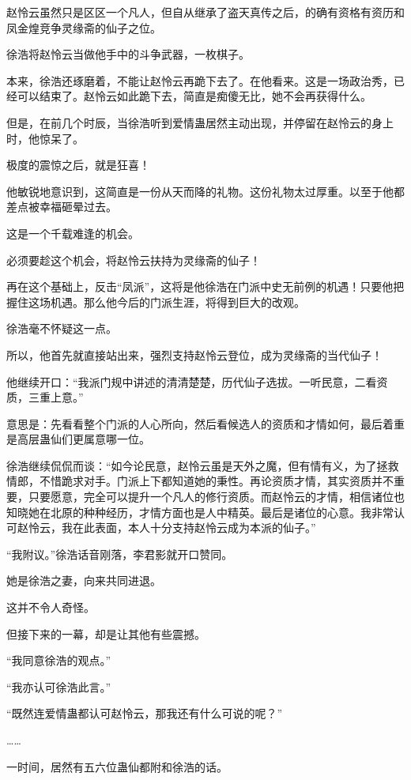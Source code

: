 \begin{this_body}
赵怜云虽然只是区区一个凡人，但自从继承了盗天真传之后，的确有资格有资历和凤金煌竞争灵缘斋的仙子之位。

徐浩将赵怜云当做他手中的斗争武器，一枚棋子。

本来，徐浩还琢磨着，不能让赵怜云再跪下去了。在他看来。这是一场政治秀，已经可以结束了。赵怜云如此跪下去，简直是痴傻无比，她不会再获得什么。

但是，在前几个时辰，当徐浩听到爱情蛊居然主动出现，并停留在赵怜云的身上时，他惊呆了。

极度的震惊之后，就是狂喜！

他敏锐地意识到，这简直是一份从天而降的礼物。这份礼物太过厚重。以至于他都差点被幸福砸晕过去。

这是一个千载难逢的机会。

必须要趁这个机会，将赵怜云扶持为灵缘斋的仙子！

再在这个基础上，反击“凤派”，这将是他徐浩在门派中史无前例的机遇！只要他把握住这场机遇。那么他今后的门派生涯，将得到巨大的改观。

徐浩毫不怀疑这一点。

所以，他首先就直接站出来，强烈支持赵怜云登位，成为灵缘斋的当代仙子！

他继续开口：“我派门规中讲述的清清楚楚，历代仙子选拔。一听民意，二看资质，三重上意。”

意思是：先看看整个门派的人心所向，然后看候选人的资质和才情如何，最后着重是高层蛊仙们更属意哪一位。

徐浩继续侃侃而谈：“如今论民意，赵怜云虽是天外之魔，但有情有义，为了拯救情郎，不惜跪求对手。门派上下都知道她的秉性。再论资质才情，其实资质并不重要，只要愿意，完全可以提升一个凡人的修行资质。而赵怜云的才情，相信诸位也知晓她在北原的种种经历，才情方面也是人中精英。最后是诸位的心意。我非常认可赵怜云，我在此表面，本人十分支持赵怜云成为本派的仙子。”

“我附议。”徐浩话音刚落，李君影就开口赞同。

她是徐浩之妻，向来共同进退。

这并不令人奇怪。

但接下来的一幕，却是让其他有些震撼。

“我同意徐浩的观点。”

“我亦认可徐浩此言。”

“既然连爱情蛊都认可赵怜云，那我还有什么可说的呢？”

……

一时间，居然有五六位蛊仙都附和徐浩的话。


\end{this_body}
